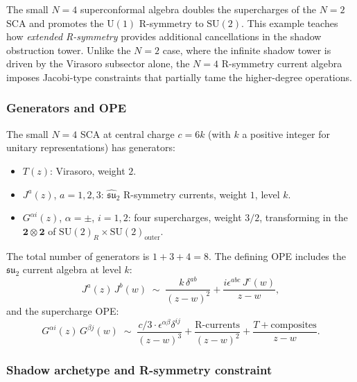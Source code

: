 The small $N{=}4$ superconformal algebra doubles the
supercharges of the $N{=}2$ SCA and promotes the $\mathrm{U}(1)$
R-symmetry to $\mathrm{SU}(2)$. This example teaches how
\emph{extended R-symmetry} provides additional cancellations in the
shadow obstruction tower. Unlike the $N{=}2$ case, where the infinite shadow
tower is driven by the Virasoro subsector alone, the $N{=}4$
R-symmetry current algebra imposes Jacobi-type constraints that
partially tame the higher-degree operations.

\subsubsection{Generators and OPE}

The small $N{=}4$ SCA at central charge $c = 6k$ (with $k$ a
positive integer for unitary representations) has generators:
\begin{itemize}[nosep]
\item $T(z)$: Virasoro, weight $2$.
\item $J^a(z)$, $a = 1,2,3$: $\widehat{\mathfrak{su}}_2$
 R-symmetry currents, weight $1$, level $k$.
\item $G^{\alpha i}(z)$, $\alpha = \pm$, $i = 1,2$:
 four supercharges, weight $3/2$, transforming in the
 $\mathbf{2} \otimes \mathbf{2}$ of
 $\mathrm{SU}(2)_R \times \mathrm{SU}(2)_{\mathrm{outer}}$.
\end{itemize}
The total number of generators is $1 + 3 + 4 = 8$. The defining
OPE includes the $\mathfrak{su}_2$ current algebra at level $k$:
\begin{equation}\label{eq:N4-JJ}
 J^a(z)\,J^b(w)
 \;\sim\;
 \frac{k\,\delta^{ab}}{(z-w)^2}
 + \frac{i\epsilon^{abc}\,J^c(w)}{z-w},
\end{equation}
and the supercharge OPE:
\begin{equation}\label{eq:N4-GG}
 G^{\alpha i}(z)\, G^{\beta j}(w)
 \;\sim\;
 \frac{c/3 \cdot \epsilon^{\alpha\beta}\delta^{ij}}{(z-w)^3}
 + \frac{\text{R-currents}}{(z-w)^2}
 + \frac{T + \text{composites}}{z-w}.
\end{equation}

\subsubsection{Shadow archetype and R-symmetry constraint}

